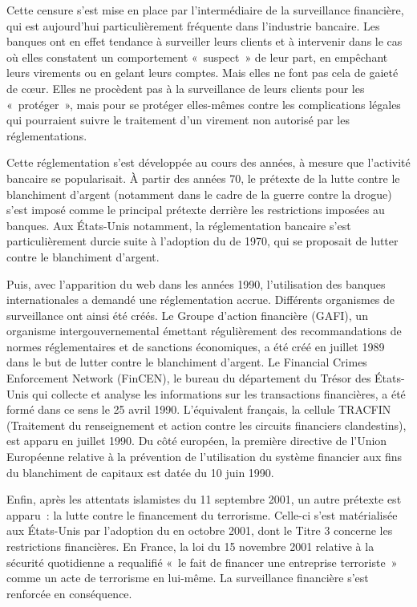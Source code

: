 Cette censure s'est mise en place par l'intermédiaire de la surveillance financière, qui est aujourd'hui particulièrement fréquente dans l'industrie bancaire. Les banques ont en effet tendance à surveiller leurs clients et à intervenir dans le cas où elles constatent un comportement «~suspect~» de leur part, en empêchant leurs virements ou en gelant leurs comptes. Mais elles ne font pas cela de gaieté de cœur. Elles ne procèdent pas à la surveillance de leurs clients pour les «~protéger~», mais pour se protéger elles-mêmes contre les complications légales qui pourraient suivre le traitement d'un virement non autorisé par les réglementations.

Cette réglementation s'est développée au cours des années, à mesure que l'activité bancaire se popularisait. À partir des années 70, le prétexte de la lutte contre le blanchiment d'argent (notamment dans le cadre de la guerre contre la drogue) s'est imposé comme le principal prétexte derrière les restrictions imposées au banques. Aux États-Unis notamment, la réglementation bancaire s'est particulièrement durcie suite à l'adoption du  de 1970, qui se proposait de lutter contre le blanchiment d'argent.

Puis, avec l'apparition du web dans les années 1990, l'utilisation des banques internationales a demandé une réglementation accrue. Différents organismes de surveillance ont ainsi été créés. Le Groupe d'action financière (GAFI), un organisme intergouvernemental émettant régulièrement des recommandations de normes réglementaires et de sanctions économiques, a été créé en juillet 1989 dans le but de lutter contre le blanchiment d'argent. Le Financial Crimes Enforcement Network (FinCEN), le bureau du département du Trésor des États-Unis qui collecte et analyse les informations sur les transactions financières, a été formé dans ce sens le 25 avril 1990. L'équivalent français, la cellule TRACFIN (Traitement du renseignement et action contre les circuits financiers clandestins), est apparu en juillet 1990. Du côté européen, la première directive de l'Union Européenne relative à la prévention de l'utilisation du système financier aux fins du blanchiment de capitaux est datée du 10 juin 1990.

Enfin, après les attentats islamistes du 11 septembre 2001, un autre prétexte est apparu~: la lutte contre le financement du terrorisme. Celle-ci s'est matérialisée aux États-Unis par l'adoption du  en octobre 2001, dont le Titre 3 concerne les restrictions financières. En France, la loi du 15 novembre 2001 relative à la sécurité quotidienne a requalifié «~le fait de financer une entreprise terroriste~» comme un acte de terrorisme en lui-même. La surveillance financière s'est renforcée en conséquence.

